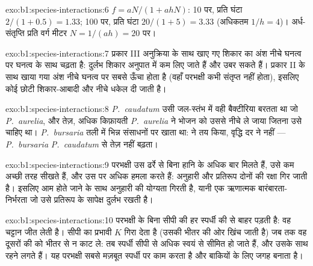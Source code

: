 \begin{solution}{exo:b1:species-interactions:6}
$f = aN/(1 + ahN)$: 10 पर, प्रति घंटा $2/(1 + 0.5) = 1.33$; 100 पर,
प्रति घंटा $20/(1 + 5) = 3.33$ (अधिकतम $1/h = 4$)। अर्ध-संतृप्ति
प्रति वर्ग मीटर $N = 1/(ah) = 20$ पर।
\end{solution}

\begin{solution}{exo:b1:species-interactions:7}
प्रकार III अनुक्रिया के साथ खाए गए शिकार का अंश नीचे घनत्व पर
घनत्व के साथ चढ़ता है: दुर्लभ शिकार अनुपात में कम लिए जाते हैं और
उबर सकते हैं। प्रकार II के साथ खाया गया अंश नीचे घनत्व पर सबसे ऊँचा
होता है (वहाँ परभक्षी कभी संतृप्त नहीं होता), इसलिए कोई छोटी
शिकार-आबादी और नीचे धकेल दी जाती है।
\end{solution}

\begin{solution}{exo:b1:species-interactions:8}
\emph{P.~caudatum} उसी जल-स्तंभ में वही बैक्टीरिया बरतता था
जो \emph{P.~aurelia}, और तेज़, अधिक किफ़ायती \emph{P.~aurelia}
ने भोजन को उससे नीचे ले जाया जितना उसे चाहिए था। \emph{P.~bursaria}
तली में भिन्न संसाधनों पर खाता था:  ने तय किया, वृद्धि दर ने नहीं
--- \emph{P.~bursaria} \emph{P.~caudatum} से तेज़ नहीं बढ़ता।
\end{solution}

\begin{solution}{exo:b1:species-interactions:9}
परभक्षी उस ढर्रे से बिना हानि के अधिक बार मिलते हैं, उसे कम अच्छी तरह
सीखते हैं, और उस पर अधिक हमला करते हैं: अनुहारी और प्रतिरूप दोनों की
रक्षा गिर जाती है। इसलिए आम होते जाने के साथ अनुहारी की योग्यता गिरती है,
यानी एक ऋणात्मक बारंबारता-निर्भरता जो उसे प्रतिरूप के सापेक्ष दुर्लभ रखती है।
\end{solution}

\begin{solution}{exo:b1:species-interactions:10}
परभक्षी के बिना सीपी की  हर स्पर्धी की  से बाहर पड़ती
है: वह चट्टान जीत लेती है।  सीपी का प्रभावी $K$ गिरा देता है
(उसकी  भीतर की ओर खिंच जाती है) जब तक वह
दूसरों की  को भीतर से न काट ले: तब स्पर्धी सीपी से अधिक
स्वयं से सीमित हो जाते हैं, और उसके साथ रहने लगते हैं। यह
परभक्षी सबसे मज़बूत स्पर्धी पर काम करता है और बाकियों के लिए जगह बनाता है।
\end{solution}

